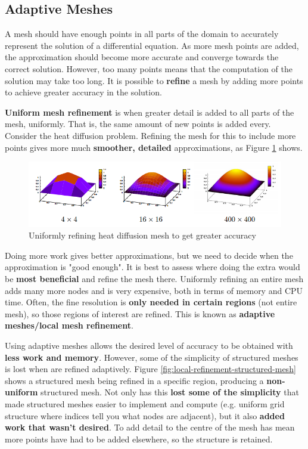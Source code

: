 \documentclass{article}
\begin{document}
\subsection{Adaptive Meshes}
\label{sec:adaptive-meshes}

A mesh should have enough points in all parts of the domain to accurately represent the solution of a differential equation. As more mesh points are added, the approximation should become more accurate and converge towards the correct solution. However, too many points means that the computation of the solution may take too long. It is possible to \textbf{refine} a mesh by adding more points to achieve greater accuracy in the solution.

\textbf{Uniform mesh refinement} is when greater detail is added to all parts of the mesh, uniformly. That is, the same amount of new points is added every. Consider the heat diffusion problem. Refining the mesh for this to include more points gives more much \textbf{smoother, detailed} approximations, as Figure \ref{fig:uniform-refinement} shows.

\begin{figure}
	\centering
	\includegraphics[scale=0.6]{figures/uniform-refinement.png}
	\caption{Uniformly refining heat diffusion mesh to get greater accuracy}
	\label{fig:uniform-refinement}
\end{figure}

Doing more work gives better approximations, but we need to decide when the approximation is "good enough". It is best to assess where doing the extra would be \textbf{most beneficial} and refine the mesh there. Uniformly refining an entire mesh adds many more nodes and is very expensive, both in terms of memory and CPU time. Often, the fine resolution is \textbf{only needed in certain regions} (not entire mesh), so those regions of interest are refined. This is known as \textbf{adaptive meshes/local mesh refinement}.

Using adaptive meshes allows the desired level of accuracy to be obtained with \textbf{less work and memory}. However, some of the simplicity of structured meshes is lost when are refined adaptively. Figure \ref{fig:local-refinement-structured-mesh} shows a structured mesh being refined in a specific region, producing a \textbf{non-uniform} structured mesh. Not only has this \textbf{lost some of the simplicity} that made structured meshes easier to implement and compute (e.g. uniform grid structure where indices tell you what nodes are adjacent), but it also \textbf{added work that wasn't desired}. To add detail to the centre of the mesh has mean more points have had to be added elsewhere, so the structure is retained.
\end{document}

